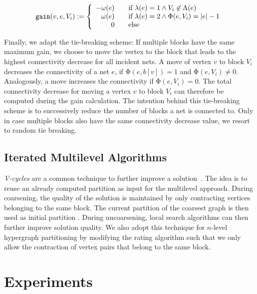 \documentclass[runningheads,a4paper]{llncs}
\begin{document}
\begin{equation}
\FuncSty{gain}(v,e,V_i) :=  \left\{ 
  \begin{array}{r l}
    -\omega(e) & \quad \text{if $\mathrm{\lambda}(e)= 1 \wedge V_i \not\in \mathrm{\Lambda}(e)$}\\
    \omega(e)  & \quad \text{if $\mathrm{\lambda}(e)= 2 \wedge \mathrm{\Phi}(e,V_i)=|e| - 1 $} \\
    0          & \quad \text{else}
  \end{array} \right.
\end{equation}


Finally, we adapt the tie-breaking scheme: If multiple blocks have the same maximum gain, we choose
to move the vertex to the block that leads to the highest connectivity decrease for all incident nets.
A move of vertex $v$ to block $V_i$ decreases the connectivity of a net $e$, if $\mathrm{\Phi}(e, b[v]) = 1$ 
and $\mathrm{\Phi}(e, V_i) \neq 0$. Analogously, a move increases the connectivity if $\mathrm{\Phi}(e, V_i) = 0$.
The total connectivity decrease for moving a vertex $v$ to block $V_i$ can therefore be computed during the gain calculation. 
The intention behind this tie-breaking scheme is to
successively reduce the number of blocks a net is connected to. Only in case multiple blocks also have the same 
connectivity decrease value, we resort to random tie breaking.


\subsection{Iterated Multilevel Algorithms}  \label{GlobalSearch}
\emph{V-cycles} are a common technique 
to further improve a solution~\cite{hMetisRB,KahipWFCycles,WalshawVcycle}. The idea is to reuse an already computed partition as input for the multilevel approach. 
During coarsening, the quality of the solution is maintained by only contracting vertices
belonging to the same block. The current partition of the coarsest graph is then used as initial partition . During uncoarsening, local search 
algorithms can then further improve solution quality. 
We also adopt this technique for $n$-level hypergraph partitioning by modifying the rating algorithm 
such that we only allow the contraction of vertex pairs that belong to the same block. 

\section{Experiments} \label{Experiments}
\end{document}
